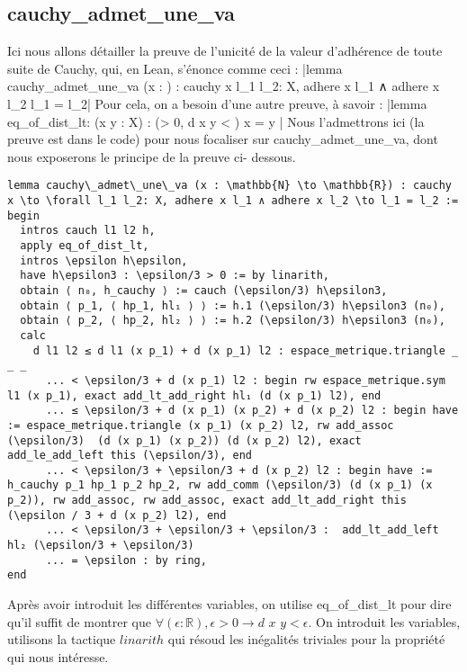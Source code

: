 \subsection{cauchy\_admet\_une\_va}
Ici nous allons détailler la preuve de l'unicité de la valeur d'adhérence de toute suite de Cauchy, qui, en Lean, s'énonce comme ceci : 
|lemma cauchy\_admet\_une\_va (x :  \to {}) : cauchy x \to \forall l_1 l_2: X, adhere x l_1 ∧ adhere x l_2 \to l_1 = l_2|
Pour cela, on a besoin d'une autre preuve, à savoir : 
|lemma eq\_of\_dist\_lt: (x y : X) : (\forall \epsilon > 0, d x y < \epsilon) \to x = y |
Nous l'admettrons ici (la preuve est dans le code) pour nous focaliser sur cauchy\_admet\_une\_va, dont nous exposerons le principe de la preuve ci- dessous. 
\begin{verbatim}
lemma cauchy\_admet\_une\_va (x : \mathbb{N} \to \mathbb{R}) : cauchy x \to \forall l_1 l_2: X, adhere x l_1 ∧ adhere x l_2 \to l_1 = l_2 :=
begin
  intros cauch l1 l2 h,
  apply eq_of_dist_lt,
  intros \epsilon h\epsilon,
  have h\epsilon3 : \epsilon/3 > 0 := by linarith,
  obtain ⟨ n₀, h_cauchy ⟩ := cauch (\epsilon/3) h\epsilon3,
  obtain ⟨ p_1, ⟨ hp_1, hl₁ ⟩ ⟩ := h.1 (\epsilon/3) h\epsilon3 (n₀),
  obtain ⟨ p_2, ⟨ hp_2, hl₂ ⟩ ⟩ := h.2 (\epsilon/3) h\epsilon3 (n₀),
  calc
    d l1 l2 ≤ d l1 (x p_1) + d (x p_1) l2 : espace_metrique.triangle _ _ _
      ... < \epsilon/3 + d (x p_1) l2 : begin rw espace_metrique.sym l1 (x p_1), exact add_lt_add_right hl₁ (d (x p_1) l2), end 
      ... ≤ \epsilon/3 + d (x p_1) (x p_2) + d (x p_2) l2 : begin have := espace_metrique.triangle (x p_1) (x p_2) l2, rw add_assoc (\epsilon/3)  (d (x p_1) (x p_2)) (d (x p_2) l2), exact add_le_add_left this (\epsilon/3), end 
      ... < \epsilon/3 + \epsilon/3 + d (x p_2) l2 : begin have := h_cauchy p_1 hp_1 p_2 hp_2, rw add_comm (\epsilon/3) (d (x p_1) (x p_2)), rw add_assoc, rw add_assoc, exact add_lt_add_right this (\epsilon / 3 + d (x p_2) l2), end 
      ... < \epsilon/3 + \epsilon/3 + \epsilon/3 :  add_lt_add_left hl₂ (\epsilon/3 + \epsilon/3)
      ... = \epsilon : by ring,
end
\end{verbatim}
Après avoir introduit les différentes variables, on utilise eq\_of\_dist\_lt pour dire qu'il suffit de montrer que $\forall (\epsilon : \mathbb{R}), \epsilon > 0 \to d$ $x$ $y < \epsilon$. On introduit les variables, utilisons la tactique $\mathit{linarith}$ qui résoud les inégalités triviales pour la propriété qui nous intéresse. \\
